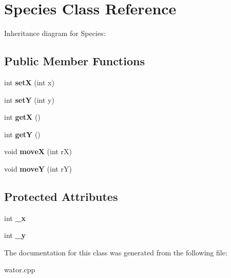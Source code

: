 \hypertarget{class_species}{}\section{Species Class Reference}
\label{class_species}


Inheritance diagram for Species\+:
\subsection*{Public Member Functions}
\begin{DoxyCompactItemize}
\item 
int {\bfseries setX} (int x)\hypertarget{class_species_a12d4934d6529d066063c7d83c11d8ffc}{}\label{class_species_a12d4934d6529d066063c7d83c11d8ffc}

\item 
int {\bfseries setY} (int y)\hypertarget{class_species_a4694f042957d4cb03a4acff66ed64c23}{}\label{class_species_a4694f042957d4cb03a4acff66ed64c23}

\item 
int {\bfseries getX} ()\hypertarget{class_species_a9d637cb4cf605964c82bf912c877138a}{}\label{class_species_a9d637cb4cf605964c82bf912c877138a}

\item 
int {\bfseries getY} ()\hypertarget{class_species_a00983015111704793c707257e5a3d2a3}{}\label{class_species_a00983015111704793c707257e5a3d2a3}

\item 
void {\bfseries moveX} (int rX)\hypertarget{class_species_aacb511912a69e8e954c786cf9cf7b0c7}{}\label{class_species_aacb511912a69e8e954c786cf9cf7b0c7}

\item 
void {\bfseries moveY} (int rY)\hypertarget{class_species_a8967e3c6f34bbe06d0b51f75a7e28485}{}\label{class_species_a8967e3c6f34bbe06d0b51f75a7e28485}

\end{DoxyCompactItemize}
\subsection*{Protected Attributes}
\begin{DoxyCompactItemize}
\item 
int {\bfseries \+\_\+x}\hypertarget{class_species_ad9b36801858646cb8bf5d07bfa21fef1}{}\label{class_species_ad9b36801858646cb8bf5d07bfa21fef1}

\item 
int {\bfseries \+\_\+y}\hypertarget{class_species_a42c0833f8521c1fa0ad655418c4dd295}{}\label{class_species_a42c0833f8521c1fa0ad655418c4dd295}

\end{DoxyCompactItemize}


The documentation for this class was generated from the following file\+:\begin{DoxyCompactItemize}
\item 
wator.\+cpp\end{DoxyCompactItemize}
